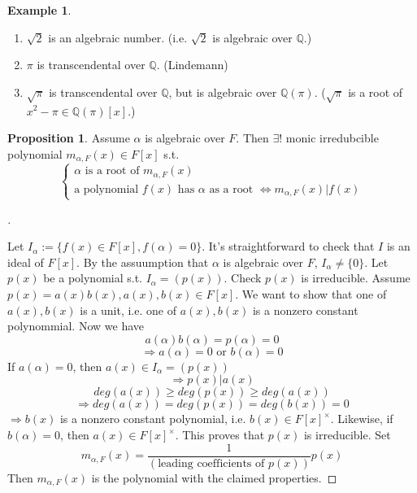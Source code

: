 \documentclass{article}
\theoremstyle{definition}
\newtheorem{ex}{Example}
\newtheorem{prop}{Proposition}
\newenvironment{proofs}[1][\proofname]{%
  \begin{proof}[#1]$ $\par\nobreak\ignorespaces
}{%
  \end{proof}
}
\begin{document}
\begin{ex}
	\begin{enumerate}
		\item[(1)] $\sqrt{2}$ is an algebraic number. 
			(i.e. $\sqrt{2}$ is algebraic over $\mathbb{Q}$.)

		\item[(2)] $\pi$ is transcendental over $\mathbb{Q}$. (Lindemann)

		\item[(3)] $\sqrt{\pi}$ is transcendental over $\mathbb{Q}$, but is algebraic over $\mathbb{Q}(\pi)$.
			($\sqrt{\pi}$ is a root of $x^2 - \pi \in \mathbb{Q}(\pi)[x]$.)
	\end{enumerate}
\end{ex}

\begin{prop}
	Assume $\alpha$ is algebraic over $F$.
	Then $\exists !$ monic irredubcible polynomial $m_{\alpha, F}(x) \in F[x]$ s.t. 
	\[
		\begin{cases}
			\alpha \text{ is a root of } m_{\alpha, F}(x)\\
			\text{a polynomial } f(x) \text{ has } \alpha \text{ as a root } \Leftrightarrow m_{\alpha, F}(x) | f(x)
		\end{cases}
	\]
\end{prop}

\begin{proofs}
	Let $I_\alpha := \{f(x) \in F[x], f(\alpha) = 0\}$. 
	It's straightforward to check that $I$ is an ideal of $F[x]$. 
	By the assuumption that $\alpha$ is algebraic over $F$, $I_\alpha \neq \{0\}$.
	Let $p(x)$ be a polynomial s.t. $I_\alpha = (p(x))$.
	Check $p(x)$ is irreducible.
	Assume $p(x) = a(x) b(x), a(x), b(x) \in F[x]$.
	We want to show that one of $a(x), b(x)$ is a unit, i.e. one of $a(x), b(x)$ is a nonzero constant polynommial.
	Now we have 
	\[
		a(\alpha) b(\alpha) = p(\alpha) = 0
	\]
	\[
		\Rightarrow a(\alpha) = 0 \text{ or } b(\alpha) = 0
	\]
	If $a(\alpha) = 0$, then $a(x) \in I_\alpha = (p(x))$
	\[
		\Rightarrow p(x) | a(x)
	\]
	\[
		deg(a(x)) \geq deg(p(x)) \geq deg(a(x))
	\]
	\[
		\Rightarrow deg(a(x)) = deg(p(x)) = deg(b(x)) = 0
	\]
	$\Rightarrow b(x)$ is a nonzero constant polynomial, i.e. $b(x) \in F[x]^\times$.
	Likewise, if $b(\alpha) = 0$, then $a(x) \in F[x]^\times$.
	This proves that $p(x)$ is irreducible.
	Set
	\[
		m_{\alpha, F}(x) = \frac{1}{(\text{leading coefficients of }p(x))} p(x)
	\]
	Then $m_{\alpha, F}(x)$ is the polynomial with the claimed properties.
\end{proofs}
\end{document}
